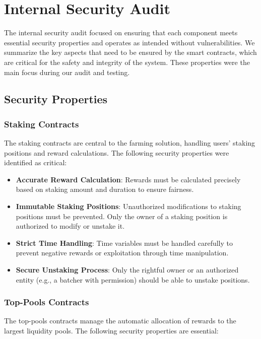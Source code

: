 \documentclass{article}
\begin{document}
\section{Internal Security Audit}

The internal security audit focused on ensuring that each component meets essential security properties and operates as intended without vulnerabilities. We summarize the key aspects that need to be ensured by the smart contracts, which are critical for the safety and integrity of the system. These properties were the main focus during our audit and testing.

\subsection{Security Properties}

\subsubsection{Staking Contracts}

The staking contracts are central to the farming solution, handling users' staking positions and reward calculations. The following security properties were identified as critical:

\begin{itemize}
    \item \textbf{Accurate Reward Calculation}: Rewards must be calculated precisely based on staking amount and duration to ensure fairness.
    \item \textbf{Immutable Staking Positions}: Unauthorized modifications to staking positions must be prevented. Only the owner of a staking position is authorized to modify or unstake it.
    \item \textbf{Strict Time Handling}: Time variables must be handled carefully to prevent negative rewards or exploitation through time manipulation.
    \item \textbf{Secure Unstaking Process}: Only the rightful owner or an authorized entity (e.g., a batcher with permission) should be able to unstake positions.
\end{itemize}

\subsubsection{Top-Pools Contracts}

The top-pools contracts manage the automatic allocation of rewards to the largest liquidity pools. The following security properties are essential:
\end{document}
